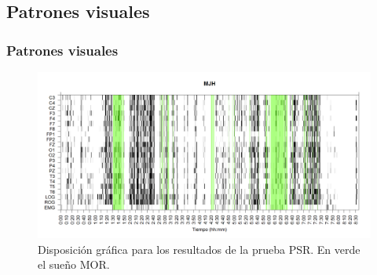 \documentclass{beamer}
\begin{document}

\subsection{Patrones visuales}

\begin{frame}\frametitle{Patrones visuales}
\begin{figure}
\includegraphics[width=\textwidth]
{./g170413/MJNNVIGILOS_est.png}
\caption{Disposici\'on gr\'afica para los resultados de la prueba PSR.
En verde el sue\~no MOR.
}
\end{figure}
\end{frame}

\end{document}
